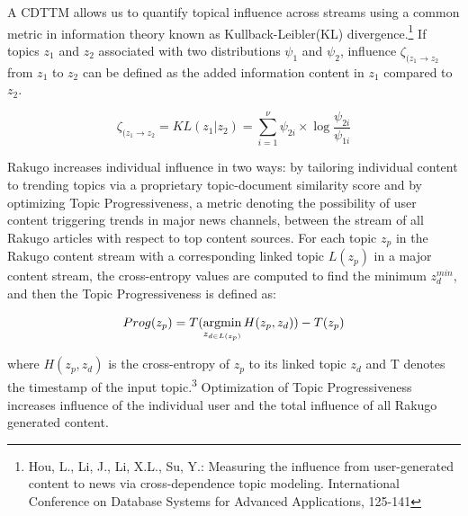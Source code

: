 \documentclass{article}
\begin{document}
A CDTTM allows us to quantify topical influence across streams using a common metric in information theory known as Kullback-Leibler(KL) divergence.\footnote{Hou, L., Li, J., Li, X.L., Su, Y.: Measuring the influence from user-generated content to news via cross-dependence topic modeling. International Conference on Database Systems for Advanced Applications, 125-141} If topics $z_{1}$ and $z_{2}$ associated with two distributions \begin{math} \psi_1 \end{math} and \begin{math} \psi_2 \end{math}, influence \begin{math} \zeta_{(z_{1} \rightarrow z_{2}} \end{math} from $z_{1}$ to $z_{2}$ can be defined as the added information content in $z_{1}$ compared to $z_{2}$.

\begin{equation*}
\zeta_{(z_{1} \rightarrow z_{2}} = KL(z_{1} | z_{2}) = \sum^{\nu}_{i=1} \psi_{2i} \times \log \frac{\psi_{2i}}{\psi_{1i}} 
\end{equation*}

Rakugo increases individual influence in two ways: by tailoring individual content to trending topics via a proprietary topic-document similarity score and by optimizing Topic Progressiveness, a metric denoting the possibility of user content triggering trends in major news channels, between the stream of all Rakugo articles with respect to top content sources. For each topic $z_{p}$ in the Rakugo content stream with a corresponding linked topic $L(z_{p})$ in a major content stream, the cross-entropy values are computed to find the minimum \begin{math} z^{min}_{d} \end{math}, and then the Topic Progressiveness is defined as:

\begin{equation*}
Prog(z_{p}) = T(\operatornamewithlimits{argmin}\limits_{z_{d\in L(z_{p})}} H(z_{p}, z_{d})) - T(z_{p})
\end{equation*}

where \begin{math} H(z_{p},z_{d}) \end{math} is the cross-entropy of \begin{math} z_{p} \end{math} to its linked topic \begin{math} z_{d} \end{math} and T denotes the timestamp of the input topic.\textsuperscript{3} Optimization of Topic Progressiveness increases influence of the individual user and the total influence of all Rakugo generated content.
\end{document}

